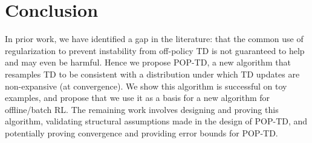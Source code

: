 \documentclass[11pt]{book}
\begin{document}
\chapter{Conclusion}

In prior work, we have identified a gap in the literature: that the common use of regularization to prevent instability from off-policy TD is not guaranteed to help and may even be harmful. Hence we propose POP-TD, a new algorithm that resamples TD to be consistent with a distribution under which TD updates are non-expansive (at convergence). We show this algorithm is successful on toy examples, and propose that we use it as a basis for a new algorithm for offline/batch RL. The remaining work involves designing and proving this algorithm, validating structural assumptions made in the design of POP-TD, and potentially proving convergence and providing error bounds for POP-TD.


\backmatter
\printbibliography

\appendix
\end{document}
